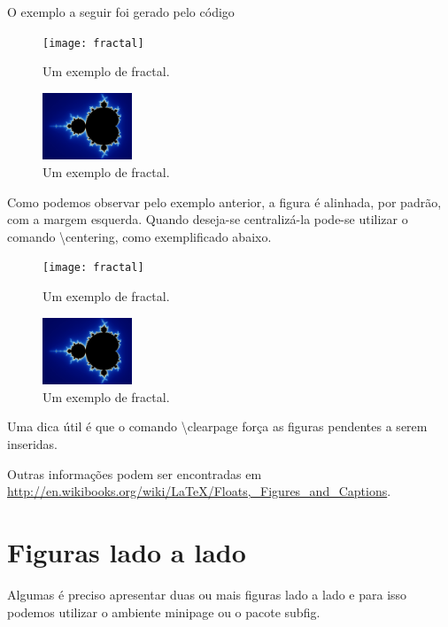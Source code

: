 O exemplo a seguir foi gerado pelo código
\begin{latexcode}
    \begin{figure}[h!]
        \texttt{[image: fractal]}
        \caption{Um exemplo de fractal.}
        \label{F:fractal}
    \end{figure}
\end{latexcode}
\begin{figure}[h!]
    \includegraphics[height=2cm]{figures/fractal}
    \caption{Um exemplo de fractal.}
    \label{F:fractal}
\end{figure}

Como podemos observar pelo exemplo anterior, a figura é alinhada, por padrão, com a margem esquerda. Quando deseja-se centralizá-la pode-se utilizar o comando \textbackslash\textsf{centering}, como exemplificado abaixo.
\begin{latexcode}
    \begin{figure}[h!]
        \centering
        \texttt{[image: fractal]}
        \caption{Um exemplo de fractal.}
        \label{F:fractal}
    \end{figure}
\end{latexcode}
\begin{figure}[h!]
    \centering
    \includegraphics[height=2cm]{figures/fractal}
    \caption{Um exemplo de fractal.}
    \label{F:fractal}
\end{figure}

Uma dica útil é que o comando \textbackslash\textsf{clearpage} força as figuras pendentes a serem inseridas.

Outras informações podem ser encontradas em \url{http://en.wikibooks.org/wiki/LaTeX/Floats,_Figures_and_Captions}.

\section{Figuras lado a lado}

Algumas é preciso apresentar duas ou mais figuras lado a lado e para isso podemos utilizar o ambiente \textsf{minipage} ou o pacote \textsf{subfig}.

